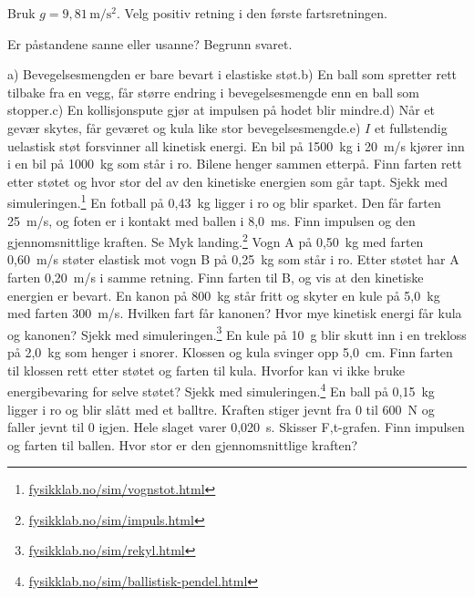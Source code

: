 \documentclass[11pt]{article}
\begin{document}
Bruk $g = 9{,}81\,\mathrm{m/s^{2}}$. Velg positiv retning i den første fartsretningen.

\begin{oppgaveliste}
\oppgave {}Er påstandene sanne eller usanne? Begrunn svaret.

a) Bevegelsesmengden er bare bevart i elastiske støt.\newline b) En ball som spretter rett tilbake fra en vegg, får større endring i bevegelsesmengde enn en ball som stopper.\newline c) En kollisjonspute gjør at impulsen på hodet blir mindre.\newline d) Når et gevær skytes, får geværet og kula like stor bevegelsesmengde.\newline e) $I$ et fullstendig uelastisk støt forsvinner all kinetisk energi.
\svar
\oppgave {}En bil på 1500~kg i 20~m/s kjører inn i en bil på 1000~kg som står i ro. Bilene henger sammen etterpå. Finn farten rett etter støtet og hvor stor del av den kinetiske energien som går tapt. Sjekk med simuleringen.\footnote{\url{fysikklab.no/sim/vognstot.html}}
\svar
\oppgave {}En fotball på 0,43~kg ligger i ro og blir sparket. Den får farten 25~m/s, og foten er i kontakt med ballen i 8,0~ms. Finn impulsen og den gjennomsnittlige kraften. Se Myk landing.\footnote{\url{fysikklab.no/sim/impuls.html}}
\svar
\oppgave {}Vogn A på 0,50~kg med farten 0,60~m/s støter elastisk mot vogn B på 0,25~kg som står i ro. Etter støtet har A farten 0,20~m/s i samme retning. Finn farten til B, og vis at den kinetiske energien er bevart.
\svar
\oppgave {}En kanon på 800~kg står fritt og skyter en kule på 5,0~kg med farten 300~m/s. Hvilken fart får kanonen? Hvor mye kinetisk energi får kula og kanonen? Sjekk med simuleringen.\footnote{\url{fysikklab.no/sim/rekyl.html}}
\svar
\oppgave {}En kule på 10~g blir skutt inn i en trekloss på 2,0~kg som henger i snorer. Klossen og kula svinger opp 5,0~cm. Finn farten til klossen rett etter støtet og farten til kula. Hvorfor kan vi ikke bruke energibevaring for selve støtet? Sjekk med simuleringen.\footnote{\url{fysikklab.no/sim/ballistisk-pendel.html}}
\svar
\oppgave {}En ball på 0,15~kg ligger i ro og blir slått med et balltre. Kraften stiger jevnt fra 0 til 600~N og faller jevnt til 0 igjen. Hele slaget varer 0,020~s. Skisser F,t-grafen. Finn impulsen og farten til ballen. Hvor stor er den gjennomsnittlige kraften?
\svar
\end{oppgaveliste}
\end{document}

